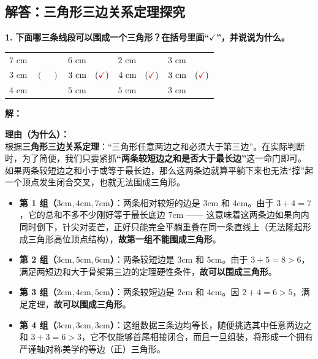 ﻿%

\subsection{解答：三角形三边关系定理探究}

\vspace{0.6cm}

\textbf{\LARGE 1.} \textbf{下面哪三条线段可以围成一个三角形？在括号里画“$\checkmark$”，并说说为什么。}

\vspace{0.4cm}

\begin{center}
\renewcommand{\arraystretch}{1.5}
\setlength{\tabcolsep}{15pt}
\begin{tabular}{llll}
$7\text{ cm}$ & $6\text{ cm}$ & $2\text{ cm}$ & $3\text{ cm}$ \\
$3\text{ cm} \quad (\quad)$ & $3\text{ cm} \quad (\textcolor{red}{\checkmark})$ & $4\text{ cm} \quad (\textcolor{red}{\checkmark})$ & $3\text{ cm} \quad (\textcolor{red}{\checkmark})$ \\
$4\text{ cm}$ & $5\text{ cm}$ & $5\text{ cm}$ & $3\text{ cm}$ \\
\end{tabular}
\end{center}

\vspace{0.4cm}
\textbf{解：}

\textbf{理由（为什么）：} \\
根据\textbf{三角形三边关系定理}：“三角形任意两边之和必须大于第三边”。在实际判断时，为了简便，我们只要紧抓\textbf{“两条较短边之和是否大于最长边”}这一命门即可。如果两条较短边之和小于或等于最长边，那么这两条边就算平躺下来也无法“撑”起一个顶点发生闭合交叉，也就无法围成三角形。
\begin{itemize}
    \item \textbf{第 1 组（$3\text{cm}, 4\text{cm}, 7\text{cm}$）}：两条相对较短的边是 $3\text{cm}$ 和 $4\text{cm}$。由于 $3 + 4 = 7$，它的总和不多不少刚好等于最长底边 $7\text{cm}$ —— 这意味着这两条边如果向内同时倒下，针尖对麦芒，正好只能完全平躺重叠在同一条直线上（无法隆起形成三角形高位顶点结构），\textbf{故第一组不能围成三角形}。
    \item \textbf{第 2 组（$3\text{cm}, 5\text{cm}, 6\text{cm}$）}：两条较短边是 $3\text{cm}$ 和 $5\text{cm}$。由于 $3 + 5 = 8 > 6$，满足两短边和大于骨架第三边的定理硬性条件，\textbf{故可以围成三角形}。
    \item \textbf{第 3 组（$2\text{cm}, 4\text{cm}, 5\text{cm}$）}：两条较短边是 $2\text{cm}$ 和 $4\text{cm}$。因 $2 + 4 = 6 > 5$，满足定理，\textbf{故可以围成三角形}。
    \item \textbf{第 4 组（$3\text{cm}, 3\text{cm}, 3\text{cm}$）}：这组数据三条边均等长，随便挑选其中任意两边之和 $3 + 3 = 6 > 3$，它不仅能够首尾相接闭合，而且一旦组装，将形成一个拥有严谨轴对称美学的等边（正）三角形。
\end{itemize}

